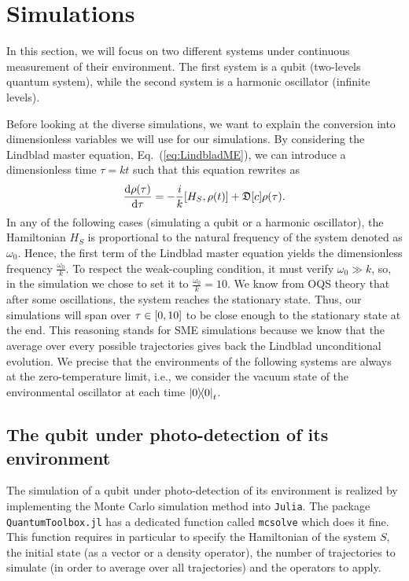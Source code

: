 \section{Simulations}\graphicspath{{../SimpleSim/}}
In this section, we will focus on two different systems under continuous measurement of their environment. The first system is a qubit (two-levels quantum system), while the second system is a harmonic oscillator (infinite levels). 

Before looking at the diverse simulations, we want to explain the conversion into dimensionless variables we will use for our simulations. By considering the Lindblad master equation, Eq.~(\ref{eq:LindbladME}), we can introduce a dimensionless time $\tau=kt$ such that this equation rewrites as
\begin{equation}
    \frac{\mathrm{d}\rho(\tau)}{\mathrm{d}\tau} = -\frac{i}{k}\qty[H_S,\rho(t)] + \mathfrak{D}[c]\rho(\tau). 
\end{equation}
In any of the following cases (simulating a qubit or a harmonic oscillator), the Hamiltonian $H_S$ is proportional to the natural frequency of the system denoted as $\omega_0$. Hence, the first term of the Lindblad master equation yields the dimensionless frequency $\frac{\omega_0}{k}$. To respect the weak-coupling condition, it must verify $\omega_0\gg k$, so, in the simulation we chose to set it to $\frac{\omega_0}{k}=10$. We know from OQS theory that after some oscillations, the system reaches the stationary state. Thus, our simulations will span over $\tau\in\qty[0,10]$ to be close enough to the stationary state at the end. This reasoning stands for SME simulations because we know that the average over every possible trajectories gives back the Lindblad unconditional evolution. We precise that the environments of the following systems are always at the zero-temperature limit, i.e., we consider the vacuum state of the environmental oscillator at each time $\ketbra{0}_t$. 

\subsection{The qubit under photo-detection of its environment}
The simulation of a qubit under photo-detection of its environment is realized by implementing the Monte Carlo simulation method into \verb|Julia|. The package \verb|QuantumToolbox.jl| has a dedicated function called \verb|mcsolve| which does it fine. This function requires in particular to specify the Hamiltonian of the system $S$, the initial state (as a vector or a density operator), the number of trajectories to simulate (in order to average over all trajectories) and the operators to apply. 

